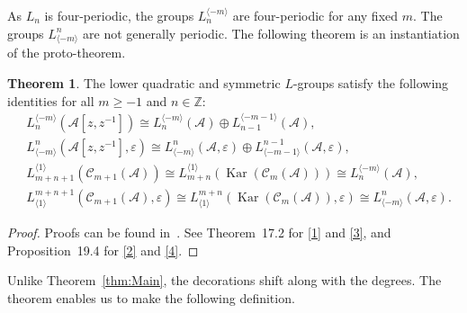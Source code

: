 \documentclass{article}
\theoremstyle{definition}
\newtheorem{thm}{Theorem}
\begin{document}
As \( L_n \) is four-periodic, the groups \( L_n^{\langle -m \rangle} \) are four-periodic for any fixed \( m \). The groups \( L^n_{\langle -m \rangle} \) are not generally periodic.  The following theorem is an instantiation of the proto-theorem.

\begin{thm}\label{thm:Lmain}
The lower quadratic and symmetric \( L \)-groups satisfy the following identities for all \( m \geq -1 \) and \( n \in \mathbb{Z} \):
\begin{align}
&L_n^{\langle -m \rangle}(\mathcal{A}[z, z^{-1}]) \cong L_n^{\langle -m \rangle}(\mathcal{A}) \oplus L_{n-1}^{\langle -m-1 \rangle}(\mathcal{A}), \label{1} \\
&L^n_{\langle -m \rangle}(\mathcal{A}[z, z^{-1}], \varepsilon) \cong L^n_{\langle -m \rangle}(\mathcal{A}, \varepsilon) \oplus L^{n-1}_{\langle -m-1 \rangle}(\mathcal{A}, \varepsilon), \label{2}\\
&L_{m+n+1}^{\langle 1 \rangle}(\mathcal{C}_{m+1}(\mathcal{A}))  \cong L_{m+n}^{\langle 1 \rangle}(\operatorname{Kar}(\mathcal{C}_m(\mathcal{A}))) \cong L_n^{\langle -m \rangle}(\mathcal{A}), \label{3}\\
&L^{m+n+1}_{\langle 1 \rangle}(\mathcal{C}_{m+1}(\mathcal{A}), \varepsilon) \cong L^{m+n}_{\langle 1 \rangle}(\operatorname{Kar}(\mathcal{C}_m(\mathcal{A})), \varepsilon)   \cong L^n_{\langle -m \rangle}(\mathcal{A}, \varepsilon). \label{4}
\end{align}
\end{thm}
\begin{proof}
    Proofs can be found in~\cite{ranicki1992lower}. See Theorem~17.2 for \eqref{1} and \eqref{3}, and Proposition~19.4 for \eqref{2} and \eqref{4}.
\end{proof}
Unlike Theorem~\ref{thm:Main}, the decorations shift along with the degrees. The theorem enables us to make the following definition. 
\end{document}
